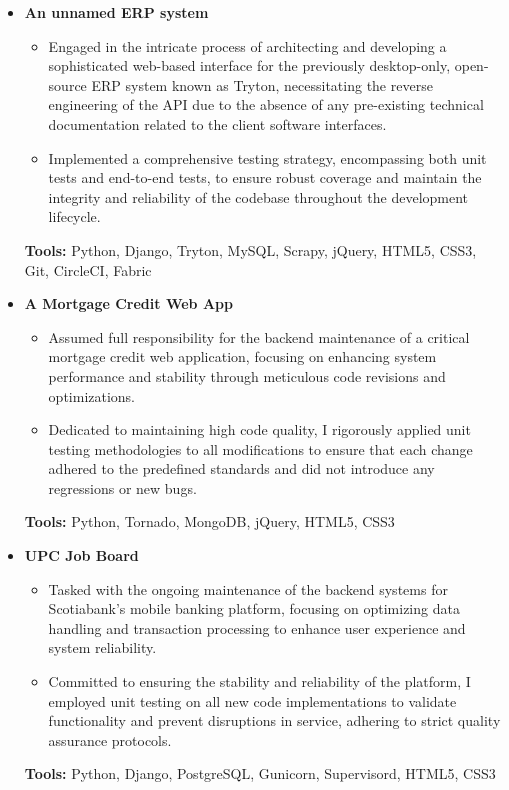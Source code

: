 \documentclass[11pt,a4paper,english]{moderncv}
\begin{document}
{
\begin{itemize}
    \item \textbf{An unnamed ERP system}
        \begin{itemize}
            \item Engaged in the intricate process of architecting and developing a sophisticated web-based interface for the previously desktop-only, open-source ERP system known as Tryton, necessitating the reverse engineering of the API due to the absence of any pre-existing technical documentation related to the client software interfaces.
            \item Implemented a comprehensive testing strategy, encompassing both unit tests and end-to-end tests, to ensure robust coverage and maintain the integrity and reliability of the codebase throughout the development lifecycle.
        \end{itemize}
        \textbf{Tools:} Python, Django, Tryton, MySQL, Scrapy, jQuery, HTML5, CSS3, Git, CircleCI, Fabric
    \item \textbf{A Mortgage Credit Web App}
        \begin{itemize}
            \item Assumed full responsibility for the backend maintenance of a critical mortgage credit web application, focusing on enhancing system performance and stability through meticulous code revisions and optimizations.
            \item Dedicated to maintaining high code quality, I rigorously applied unit testing methodologies to all modifications to ensure that each change adhered to the predefined standards and did not introduce any regressions or new bugs.
        \end{itemize}
        \textbf{Tools:} Python, Tornado, MongoDB, jQuery, HTML5, CSS3
    \item \textbf{UPC Job Board}
        \begin{itemize}
            \item Tasked with the ongoing maintenance of the backend systems for Scotiabank’s mobile banking platform, focusing on optimizing data handling and transaction processing to enhance user experience and system reliability.
            \item Committed to ensuring the stability and reliability of the platform, I employed unit testing on all new code implementations to validate functionality and prevent disruptions in service, adhering to strict quality assurance protocols.
        \end{itemize}
        \textbf{Tools:} Python, Django, PostgreSQL, Gunicorn, Supervisord, HTML5, CSS3
\end{itemize}
}
\end{document}
